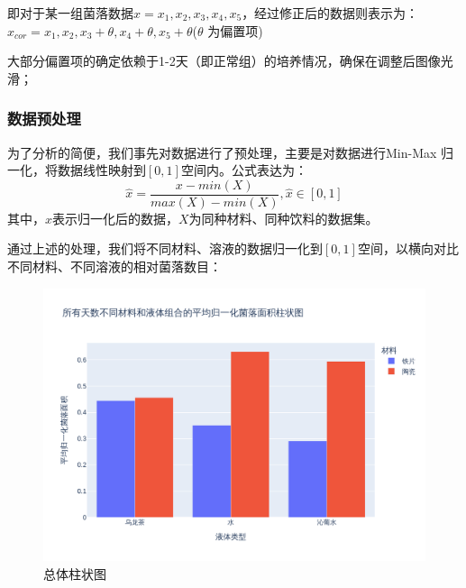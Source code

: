 \documentclass[12pt,a4paper]{ctexart}
\begin{document}
即对于某一组菌落数据${x}={x_1,x_2,x_3,x_4,x_5}$，经过修正后的数据则表示为：$x_{cor}=x_1,x_2,x_3+\theta,x_4+\theta,x_5+\theta $($\theta$ 为偏置项)

大部分偏置项的确定依赖于1-2天（即正常组）的培养情况，确保在调整后图像光滑；



\subsubsection{数据预处理}
为了分析的简便，我们事先对数据进行了预处理，主要是对数据进行Min-Max 归一化，将数据线性映射到$[0,1]$空间内。公式表达为：
\begin{equation}
    \hat{x}=\frac{x−min(X)​}{max(X)−min(X)},\hat{x} \in [0,1]
\end{equation}
其中，$\hat{x}$表示归一化后的数据，$X$为同种材料、同种饮料的数据集。

通过上述的处理，我们将不同材料、溶液的数据归一化到$[0,1]$空间，以横向对比不同材料、不同溶液的相对菌落数目：
\begin{figure}[H]  %
    \centering  %
    \includegraphics[width=\textwidth]{./plot/General/bar_normalized_overall.png}  %
    \caption{总体柱状图}  %
    \label{fig:GeneralBarFront}  %
\end{figure}
\end{document}
